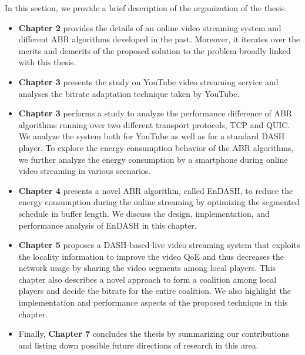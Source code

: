 In this section, we provide a brief description of the organization of the thesis.
\begin{itemize}
	\item {\bf Chapter 2} provides the details of an online video streaming system and different ABR algorithms developed in the past. Moreover, it iterates over the merits and demerits of the proposed solution to the problem broadly linked with this thesis. 
	\item {\bf Chapter 3} presents the study on YouTube video streaming service and analyses the bitrate adaptation technique taken by YouTube.
	\item {\bf Chapter 3} performs a study to analyze the performance difference of ABR algorithms running over two different transport protocols, TCP and QUIC. We analyze the system both for YouTube as well as for a standard DASH player. To explore the energy consumption behavior of the ABR algorithms, we further analyze the energy consumption by a smartphone during online video streaming in various scenarios.
	\item {\bf Chapter 4} presents a novel ABR algorithm, called EnDASH, to reduce the energy consumption during the online streaming by optimizing the segmented schedule in buffer length. We discuss the design, implementation, and performance analysis of EnDASH in this chapter. 
	\item {\bf Chapter 5} proposes a DASH-based live video streaming system that exploits the locality information to improve the video QoE and thus decreases the network usage by sharing the video segments among local players. This chapter also describes a novel approach to form a coalition among local players and decide the bitrate for the entire coalition. We also highlight the implementation and performance aspects of the proposed technique in this chapter. 
	\item Finally, {\bf Chapter 7} concludes the thesis by summarizing our contributions and listing down possible future directions of research in this area.
\end{itemize}
